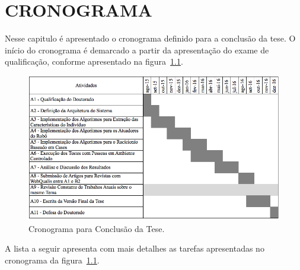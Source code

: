 \chapter{CRONOGRAMA}
\label{cap:cronograma}
Nesse capitulo é apresentado o cronograma definido para a conclusão da tese. O início do cronograma é demarcado a partir da apresentação do exame de qualificação, conforme apresentado na figura~\ref{fig:cronograma}.

\begin{figure}[ht!]
	\centering
	\includegraphics[width=\textwidth]{images/cronograma.png}
	\caption{Cronograma para Conclusão da Tese.}
	\label{fig:cronograma}
\end{figure}

A lista a seguir apresenta com mais detalhes as tarefas apresentadas no cronograma da figura~\ref{fig:cronograma}.

